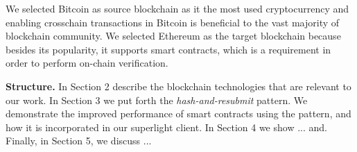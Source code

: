 We selected Bitcoin as source blockchain as it the most used cryptocurrency and
enabling crosschain transactions in Bitcoin is beneficial to the vast majority
of blockchain community. We selected Ethereum as the target blockchain because
besides its popularity, it supports smart contracts, which is a requirement
in order to perform on-chain verification.

\noindent

\textbf{Structure.} In Section 2 describe the blockchain technologies that are
relevant to our work. In Section 3 we put forth the \emph{hash-and-resubmit}
pattern. We demonstrate the improved performance of smart contracts using the
pattern, and how it is incorporated in our superlight client. In Section 4 we
show ... and.  Finally, in Section 5, we discuss ...
